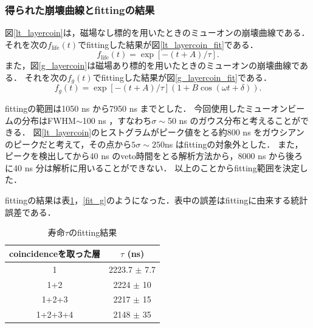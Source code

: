   

  \subsubsection{得られた崩壊曲線とfittingの結果}
  図\ref{lt_layercoin}は，磁場なし標的を用いたときのミューオンの崩壊曲線である．
  それを次の$f_{\mathrm{life}}(t)$でfittingした結果が図\ref{lt_layercoin_fit}である．
  \begin{equation*}
   f_{\mathrm{life}}(t) = \exp[-(t+A)/\tau].
  \end{equation*}
  また，図\ref{g_layercoin}は磁場あり標的を用いたときのミューオンの崩壊曲線である．
  それを次の$f_{g}(t)$でfittingした結果が図\ref{g_layercoin_fit}である．
  \begin{equation*}
   f_{g}(t) = \exp[-(t+A)/\tau](1+B\cos(\omega t + \delta)).
  \end{equation*}
  
  fittingの範囲は1050 ns から7950 ns までとした． 
  今回使用したミューオンビームの分布はFWHM$\sim$100 ns ，すなわち$\sigma\sim$50 ns のガウス分布と考えることができる．
  図\ref{lt_layercoin}のヒストグラムがピーク値をとる約800 ns をガウシアンのピークだと考えて，その点から$5\sigma\sim 250$ns はfittingの対象外とした．
  また，ピークを検出してから40 ns のveto時間をとる解析方法から，8000 ns から後ろに40 ns 分は解析に用いることができない．
  以上のことからfitting範囲を決定した．
  
  fittingの結果は表\ref{fit_lt}，\ref{fit_g}のようになった．表中の誤差はfittingに由来する統計誤差である．
  
  \begin{table}[H]
   \caption{寿命$\tau$のfitting結果}
   \label{fit_lt}
   \begin{center}
    \begin{tabular}{cc}\toprule
     coincidenceを取った層& $\tau$ (ns) \\ \midrule
     1 		        & 2223.7 $\pm$ 7.7 \\
     1+2 		& 2224 $\pm$ 10 \\
     1+2+3 		& 2217 $\pm$ 15 \\
     1+2+3+4 		& 2148 $\pm$ 35\\ \bottomrule
    \end{tabular}
   \end{center}
  \end{table}%
  
